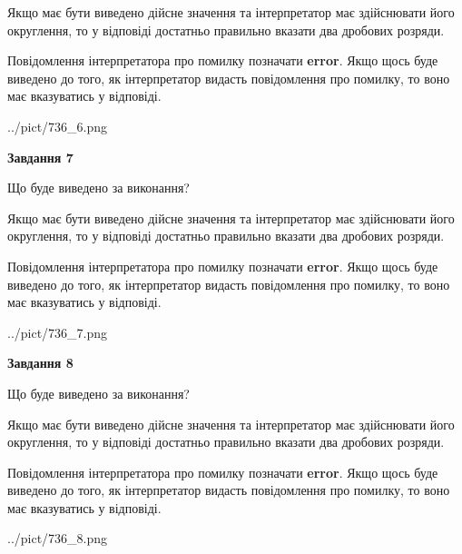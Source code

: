 \documentclass[12pt, ukrainian]{article}
\begin{document}
{\begin {Large}
Якщо має бути виведено дійсне значення та інтерпретатор має здійснювати його округлення, 
то у відповіді достатньо правильно вказати два дробових розряди.

Повідомлення інтерпретатора про помилку позначати \textbf{error}.
Якщо щось буде виведено до того, як інтерпретатор видасть повідомлення про помилку, 
то воно має вказуватись у відповіді. \par

\begin{center}
	{../pict/736_6.png}
\end{center}
\newpage

{\begin {center}\textbf{Завдання 7}\end {center}}\par
Що буде виведено за виконання? \par

Якщо має бути виведено дійсне значення та інтерпретатор має здійснювати його округлення, 
то у відповіді достатньо правильно вказати два дробових розряди.

Повідомлення інтерпретатора про помилку позначати \textbf{error}.
Якщо щось буде виведено до того, як інтерпретатор видасть повідомлення про помилку, 
то воно має вказуватись у відповіді. \par

\begin{center}
	{../pict/736_7.png}
\end{center}
\newpage

{\begin {center}\textbf{Завдання 8}\end {center}}\par
Що буде виведено за виконання? \par

Якщо має бути виведено дійсне значення та інтерпретатор має здійснювати його округлення, 
то у відповіді достатньо правильно вказати два дробових розряди.

Повідомлення інтерпретатора про помилку позначати \textbf{error}.
Якщо щось буде виведено до того, як інтерпретатор видасть повідомлення про помилку, 
то воно має вказуватись у відповіді. \par

\begin{center}
	{../pict/736_8.png}
\end{center}
\newpage


\end{Large}}
\end{document}
